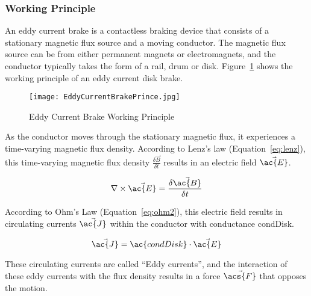 \label{sec:ecb}

\subsubsection{Working Principle}

An eddy current brake is a contactless braking device that consists of a stationary magnetic flux source and a moving conductor. The magnetic flux source can be from either permanent magnets or electromagnets, and the conductor typically takes the form of a rail, drum or disk. Figure~\ref{fig:EBp} shows the working principle of an eddy current disk brake.

\begin{figure}[H]
	\centering
	\texttt{[image: EddyCurrentBrakePrince.jpg]}
	\caption{Eddy Current Brake Working Principle}
	\citep{MASUZAWA2018335}
	\label{fig:EBp}
\end{figure}

\vspace*{-0.5cm}

As the conductor moves through the stationary magnetic flux, it experiences a time-varying magnetic flux density. According to Lenz's law (Equation~\ref{eq:lenz}), this time-varying magnetic flux density $\frac{\delta\vec{B}}{\delta t}$ results in an electric field $\vec{\ac{E}}$.

\vspace*{-0.2cm}

\begin{equation}
	\nabla \times \vec{\ac{E}} = \frac{\delta\vec{\ac{B}}}{\delta t}
	\label{eq:lenz}
\end{equation}

According to Ohm's Law (Equation~\ref{eq:ohm2}), this electric field results in circulating currents $\vec{\ac{J}}$ within the conductor with conductance \acs{condDisk}.

\vspace*{-0.2cm}

\begin{equation}
	\vec{\ac{J}} = \ac{condDisk} \cdot \vec{\ac{E}}
	\label{eq:ohm2}
\end{equation}

These circulating currents are called ``Eddy currents'', and the interaction of these eddy currents with the flux density results in a force $\vec{\acs{F}}$ that opposes the motion. \citep{Gay:2005}

\vspace*{-0.2cm}

